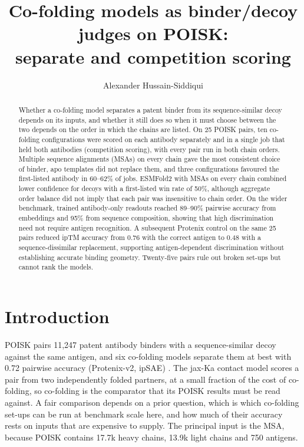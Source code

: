 \documentclass[11pt,a4paper]{article}
\title{Co-folding models as binder/decoy judges on POISK:\\separate and competition scoring}
\author{Alexander Hussain-Siddiqui}
\date{}
\begin{document}
\maketitle

\begin{abstract}
\noindent
Whether a co-folding model separates a patent binder from its sequence-similar decoy depends on its inputs, and whether it still does so when it must choose between the two depends on the order in which the chains are listed.
On 25 POISK pairs, ten co-folding configurations were scored on each antibody separately and in a single job that held both antibodies (competition scoring), with every pair run in both chain orders.
Multiple sequence alignments (MSAs) on every chain gave the most consistent choice of binder, apo templates did not replace them, and three configurations favoured the first-listed antibody in 60--62\% of jobs.
ESMFold2 with MSAs on every chain combined lower confidence for decoys with a first-listed win rate of 50\%, although aggregate order balance did not imply that each pair was insensitive to chain order.
On the wider benchmark, trained antibody-only readouts reached 89--90\% pairwise accuracy from embeddings and 95\% from sequence composition, showing that high discrimination need not require antigen recognition.
A subsequent Protenix control on the same 25 pairs reduced ipTM accuracy from 0.76 with the correct antigen to 0.48 with a sequence-dissimilar replacement, supporting antigen-dependent discrimination without establishing accurate binding geometry.
Twenty-five pairs rule out broken set-ups but cannot rank the models.
\end{abstract}

\section{Introduction}

POISK pairs 11,247 patent antibody binders with a sequence-similar decoy against the same antigen, and six co-folding models separate them at best with 0.72 pairwise accuracy (Protenix-v2, ipSAE) \cite{poisk}.
The jax-Ka contact model scores a pair from two independently folded partners, at a small fraction of the cost of co-folding, so co-folding is the comparator that its POISK results must be read against.
A fair comparison depends on a prior question, which is which co-folding set-ups can be run at benchmark scale here, and how much of their accuracy rests on inputs that are expensive to supply.
The principal input is the MSA, because POISK contains 17.7k heavy chains, 13.9k light chains and 750 antigens.
\end{document}
